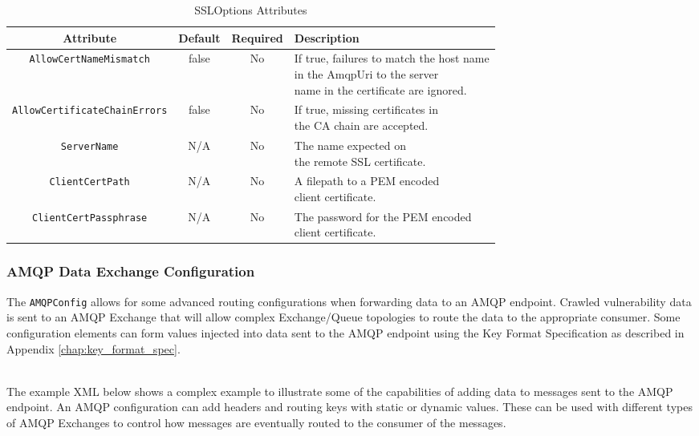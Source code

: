 \begin{table}[h]
    \caption{SSLOptions Attributes}        
    \begin{tabularx}{\textwidth}{cccl}
        \toprule
        \textbf{Attribute} & \textbf{Default} & \textbf{Required} & \textbf{Description}\\
        \midrule
        \texttt{AllowCertNameMismatch} & false & No & \makecell[l]{If true, failures to match the host name\\
        in the AmqpUri to the server\\
        name in the certificate are ignored.}\\
        \midrule
        \texttt{AllowCertificateChainErrors} & false & No & \makecell[l]{If true, missing certificates in\\
        the CA chain are accepted.}\\
        \midrule
        \texttt{ServerName} & N/A & No & \makecell[l]{The name expected on\\
        the remote SSL certificate.}\\
        \midrule
        \texttt{ClientCertPath} & N/A & No & \makecell[l]{A filepath to a PEM encoded\\
        client certificate.}\\
        \midrule
        \texttt{ClientCertPassphrase} & N/A & No & \makecell[l]{The password for the PEM encoded\\
        client certificate.}\\
        \bottomrule
    \end{tabularx}
\end{table}


\subsubsection{AMQP Data Exchange Configuration}

The \texttt{AMQPConfig} allows for some advanced routing configurations when forwarding data to an AMQP endpoint.  Crawled vulnerability
data is sent to an AMQP Exchange that will allow complex Exchange/Queue topologies to route the data to the appropriate consumer.  Some configuration
elements can form values injected into data sent to the AMQP endpoint using the Key Format Specification as described in Appendix \ref{chap:key_format_spec}.

\noindent\\The example XML below shows a complex example to illustrate some of the capabilities of adding data to messages sent to the AMQP endpoint.  
An AMQP configuration can add headers and routing keys with static or dynamic values.  These can be used with different types of AMQP Exchanges
to control how messages are eventually routed to the consumer of the messages.  

